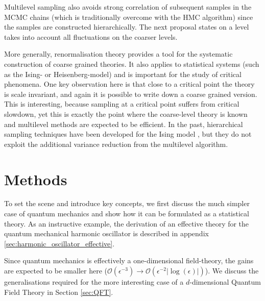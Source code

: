 \documentclass[11pt]{article}
\begin{document}
Multilevel sampling also avoids strong correlation of subsequent samples in the MCMC chains (which is traditionally overcome with the HMC algorithm) since the samples are constructed hierarchically. The next proposal states on a level takes into account all fluctuations on the coarser levels.

More generally, renormalisation theory provides a tool for the systematic construction of coarse grained theories. It also applies to statistical systems (such as the Ising- or Heisenberg-model) and is important for the study of critical phenomena. One key observation here is that close to a critical point the theory is scale invariant, and again it is possible to write down a coarse grained version. This is interesting, because sampling at a critical point suffers from critical slowdown, yet this is exactly the point where the coarse-level theory is known and multilevel methods are expected to be efficient. In the past, hierarchical sampling techniques have been developed for the Ising model \cite{Schmidt1983,Faas1986}, but they do not exploit the additional variance reduction from the multilevel algorithm.
\section{Methods}
To set the scene and introduce key concepts, we first discuss the much simpler case of quantum mechanics and show how it can be formulated as a statistical theory. As an instructive example, the derivation of an effective theory for the quantum mechanical harmonic oscillator is described in appendix \ref{sec:harmonic_oscillator_effective}.

Since quantum mechanics is effectively a one-dimensional field-theory, the gains are expected to be smaller here ($\mathcal{O}(\epsilon^{-3})\rightarrow\mathcal{O}(\epsilon^{-2}|\log(\epsilon)|)$). We discuss the generalisations required for the more interesting case of a $d$-dimensional Quantum Field Theory in Section \ref{sec:QFT}. 
\end{document}
